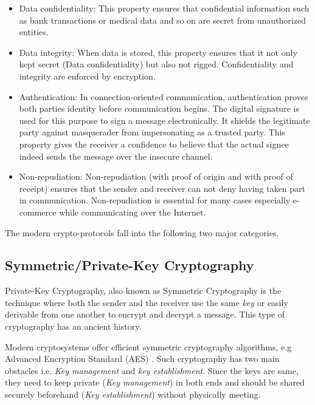 \begin{itemize}
	\item Data confidentiality: 
	This property ensures that confidential information such as bank transactions or medical data and so on are secret from unauthorized entities. 
	
	\item Data integrity:  
	When data is stored, this property ensures that it not only kept secret (Data confidentiality) but also not rigged.
	Confidentiality and integrity are enforced by encryption.
	
	\item Authentication: 
	In connection-oriented communication, authentication proves both parties identity before communication begins.
	The digital signature is used for this purpose to sign a message electronically.
	It shields the legitimate party against masquerader from impersonating as a trusted party.
	This property gives the receiver a confidence to believe that the actual signee indeed sends the message over the insecure channel.
	
	\item Non-repudiation:
	Non-repudiation (with proof of origin and with proof of receipt) ensures that the sender and receiver can not deny having taken part in communication.
	Non-repudiation is essential for many cases especially e-commerce while communicating over the Internet.
\end{itemize}

The modern crypto-protocols fall into the following two major categories. 

\subsection{Symmetric/Private-Key Cryptography} 
Private-Key Cryptography, also known as Symmetric Cryptography is the technique where both the sender and the receiver use the same \textit{key} or easily derivable from one another to encrypt and decrypt a message.
This type of cryptography has an ancient history. 

Modern cryptosystems offer efficient symmetric cryptography algorithms, e.g Advanced Encryption Standard (AES) \cite{AES_DaemenR02}.
Such cryptography has two main obstacles i.e. \textit{Key management} and \textit{key establishment}.
Since the keys are same, they need to keep private (\textit{Key management})  in both ends and should be shared securely beforehand (\textit{Key establishment}) without physically meeting.

